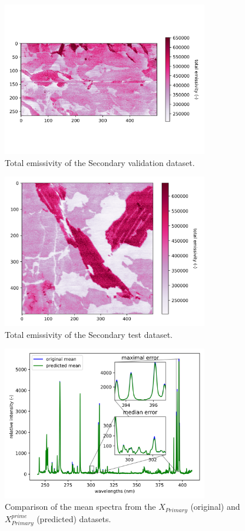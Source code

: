 \documentclass[preprint,11pt]{elsarticle}
\begin{document}
\begin{figure}[!htb]
    \centering
    \includegraphics[width=0.8\textwidth]{original_s2_val_emissivity.png}
    \caption{Total emissivity of the Secondary validation dataset.}
\end{figure}

\begin{figure}[!htb]
    \centering
    \includegraphics[width=0.8\textwidth]{original_s2_test_emissivity.png}
    \caption{Total emissivity of the Secondary test dataset.}
\end{figure}

\begin{figure}[!htb]
    \centering
    \includegraphics[width=0.8\textwidth]{predicted_vs_original_mean.png}
    \caption{Comparison of the mean spectra from the $X_{Primary}$ (original) and $X_{Primary}^{prime}$ (predicted) datasets.}
\end{figure}
\end{document}
